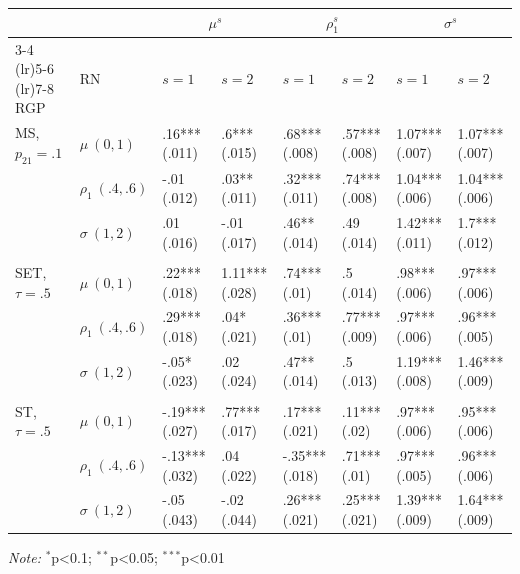 \begin{tabular}{@{\extracolsep{\fill}}l|l|llllll}
\toprule
\multicolumn{2}{l}{} & \multicolumn{2}{c}{{\(\mu^s\)}} & \multicolumn{2}{c}{{\(\rho^s_1\)}} & \multicolumn{2}{c}{{\(\sigma^s\)}} \\ 
\cmidrule(lr){3-4} \cmidrule(lr){5-6} \cmidrule(lr){7-8}
RGP & RN & \(s = 1\) & \(s = 2\) & \(s = 1\) & \(s = 2\) & \(s = 1\) & \(s = 2\) \\ 
\midrule\addlinespace[2.5pt]
MS, \(p_{21} = .1\) & \(\mu ~ (0, 1)\) & .16*** (.011) & .6*** (.015) & .68*** (.008) & .57*** (.008) & 1.07*** (.007) & 1.07*** (.007) \\ 
 & \(\rho_{1} ~ (.4, .6)\) & -.01 (.012) & .03** (.011) & .32*** (.011) & .74*** (.008) & 1.04*** (.006) & 1.04*** (.006) \\ 
 & \(\sigma ~ (1, 2)\) & .01 (.016) & -.01 (.017) & .46** (.014) & .49 (.014) & 1.42*** (.011) & 1.7*** (.012) \\ 
 &  &  &  &  &  &  &  \\ 
SET, \(\tau = .5\) & \(\mu ~ (0, 1)\) & .22*** (.018) & 1.11*** (.028) & .74*** (.01) & .5 (.014) & .98*** (.006) & .97*** (.006) \\ 
 & \(\rho_{1} ~ (.4, .6)\) & .29*** (.018) & .04* (.021) & .36*** (.01) & .77*** (.009) & .97*** (.006) & .96*** (.005) \\ 
 & \(\sigma ~ (1, 2)\) & -.05* (.023) & .02 (.024) & .47** (.014) & .5 (.013) & 1.19*** (.008) & 1.46*** (.009) \\ 
 &  &  &  &  &  &  &  \\ 
ST, \(\tau = .5\) & \(\mu ~ (0, 1)\) & -.19*** (.027) & .77*** (.017) & .17*** (.021) & .11*** (.02) & .97*** (.006) & .95*** (.006) \\ 
 & \(\rho_{1} ~ (.4, .6)\) & -.13*** (.032) & .04 (.022) & -.35*** (.018) & .71*** (.01) & .97*** (.005) & .96*** (.006) \\ 
 & \(\sigma ~ (1, 2)\) & -.05 (.043) & -.02 (.044) & .26*** (.021) & .25*** (.021) & 1.39*** (.009) & 1.64*** (.009) \\ 
\bottomrule
\end{tabular}
\begin{minipage}{\linewidth}\centering
\vspace{.05em}
\emph{Note:}  \(^{*}\)p\textless{}0.1; \(^{**}\)p\textless{}0.05; \(^{***}\)p\textless{}0.01\\
\end{minipage}
